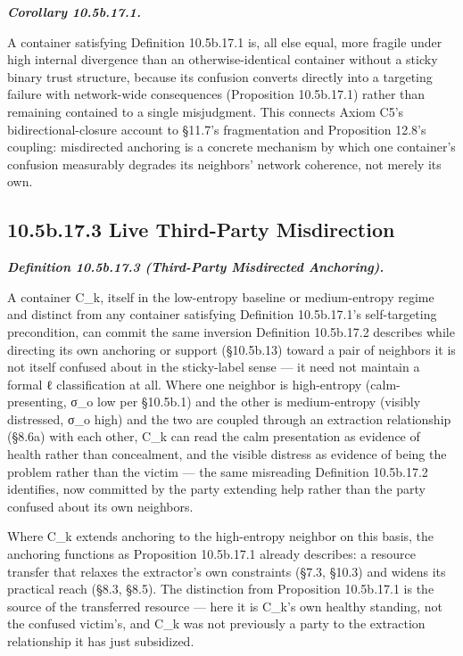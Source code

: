 \documentclass[
]{article}
\begin{document}
\emph{\textbf{Corollary 10.5b.17.1.}}

A container satisfying Definition 10.5b.17.1 is, all else equal, more
fragile under high internal divergence than an otherwise-identical
container without a sticky binary trust structure, because its confusion
converts directly into a targeting failure with network-wide
consequences (Proposition 10.5b.17.1) rather than remaining contained to
a single misjudgment. This connects Axiom C5's bidirectional-closure
account to §11.7's fragmentation and Proposition 12.8's coupling:
misdirected anchoring is a concrete mechanism by which one container's
confusion measurably degrades its neighbors' network coherence, not
merely its own.

\hypertarget{b.17.3-live-third-party-misdirection}{%
\subsection{10.5b.17.3 Live Third-Party
Misdirection}\label{b.17.3-live-third-party-misdirection}}

\emph{\textbf{Definition 10.5b.17.3 (Third-Party Misdirected
Anchoring).}}

A container C\_k, itself in the low-entropy baseline or medium-entropy
regime and distinct from any container satisfying Definition
10.5b.17.1's self-targeting precondition, can commit the same inversion
Definition 10.5b.17.2 describes while directing its own anchoring or
support (§10.5b.13) toward a pair of neighbors it is not itself confused
about in the sticky-label sense --- it need not maintain a formal ℓ
classification at all. Where one neighbor is high-entropy
(calm-presenting, σ\_o low per §10.5b.1) and the other is medium-entropy
(visibly distressed, σ\_o high) and the two are coupled through an
extraction relationship (§8.6a) with each other, C\_k can read the calm
presentation as evidence of health rather than concealment, and the
visible distress as evidence of being the problem rather than the victim
--- the same misreading Definition 10.5b.17.2 identifies, now committed
by the party extending help rather than the party confused about its own
neighbors.

Where C\_k extends anchoring to the high-entropy neighbor on this basis,
the anchoring functions as Proposition 10.5b.17.1 already describes: a
resource transfer that relaxes the extractor's own constraints (§7.3,
§10.3) and widens its practical reach (§8.3, §8.5). The distinction from
Proposition 10.5b.17.1 is the source of the transferred resource ---
here it is C\_k's own healthy standing, not the confused victim's, and
C\_k was not previously a party to the extraction relationship it has
just subsidized.
\end{document}
